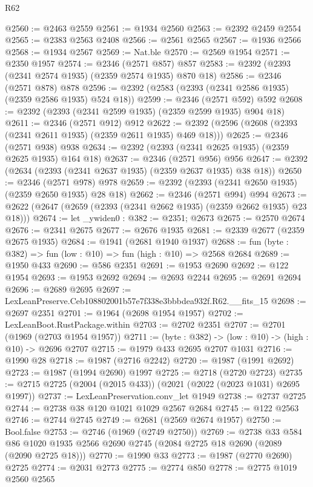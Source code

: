 \begin{lexlean}{R62}
\begin{coremodule}
@2560 := @2463 @2559
@2561 := @1934 @2560
@2563 := @2392 @2459 @2554
@2565 := @2383 @2563 @2408
@2566 := @2561 @2565
@2567 := @1936 @2566
@2568 := @1934 @2567
@2569 := Nat.ble
@2570 := @2569 @1954
@2571 := @2350 @1957
@2574 := @2346 (@2571 @857) @857
@2583 := @2392 (@2393 (@2341 @2574 @1935) (@2359 @2574 @1935) @870 @18)
@2586 := @2346 (@2571 @878) @878
@2596 := @2392 (@2583 (@2393 (@2341 @2586 @1935) (@2359 @2586 @1935) @524 @18))
@2599 := @2346 (@2571 @592) @592
@2608 := @2392 (@2393 (@2341 @2599 @1935) (@2359 @2599 @1935) @904 @18)
@2611 := @2346 (@2571 @912) @912
@2622 := @2392 (@2596 (@2608 (@2393 (@2341 @2611 @1935) (@2359 @2611 @1935) @469 @18)))
@2625 := @2346 (@2571 @938) @938
@2634 := @2392 (@2393 (@2341 @2625 @1935) (@2359 @2625 @1935) @164 @18)
@2637 := @2346 (@2571 @956) @956
@2647 := @2392 (@2634 (@2393 (@2341 @2637 @1935) (@2359 @2637 @1935) @38 @18))
@2650 := @2346 (@2571 @978) @978
@2659 := @2392 (@2393 (@2341 @2650 @1935) (@2359 @2650 @1935) @28 @18)
@2662 := @2346 (@2571 @994) @994
@2673 := @2622 (@2647 (@2659 (@2393 (@2341 @2662 @1935) (@2359 @2662 @1935) @23 @18)))
@2674 := let _ywiden0 : @382 := @2351; @2673
@2675 := @2570 @2674
@2676 := @2341 @2675
@2677 := @2676 @1935
@2681 := @2339 @2677 (@2359 @2675 @1935)
@2684 := @1941 (@2681 @1940 @1937)
@2688 := fun (byte : @382) => fun (low : @10) => fun (high : @10) => @2568 @2684
@2689 := @1950 @433
@2690 := @586 @2351
@2691 := @1953 @2690
@2692 := @122 @1954
@2693 := @1953 @2692
@2694 := @2693 @2244
@2695 := @2691 @2694
@2696 := @2689 @2695
@2697 := LexLeanPreserve.Ceb108802001b57e7f338e3bbbdea932f.R62.__fits_15
@2698 := @2697 @2351
@2701 := @1964 (@2698 @1954 @1957)
@2702 := LexLeanBoot.RustPackage.within
@2703 := @2702 @2351
@2707 := @2701 (@1969 (@2703 @1954 @1957))
@2711 := (byte : @382) -> (low : @10) -> (high : @10) -> @2696 @2707
@2715 := @1979 @433 @2695 @2707 @1031
@2716 := @1990 @28
@2718 := @1987 (@2716 @2242)
@2720 := @1987 (@1991 @2692)
@2723 := @1987 (@1994 @2690) @1997
@2725 := @2718 (@2720 @2723)
@2735 := @2715 @2725 (@2004 (@2015 @433)) (@2021 (@2022 (@2023 @1031) @2695 @1997))
@2737 := LexLeanPreservation.conv_let @1949
@2738 := @2737 @2725
@2744 := @2738 @38 @120 @1021 @1029 @2567 @2684
@2745 := @122 @2563
@2746 := @2744 @2745
@2749 := @2681 (@2569 @2674 @1957)
@2750 := Bool.false
@2753 := @2746 (@1969 (@2749 @2750))
@2769 := @2738
    @33
    @584
    @86
    @1020
    @1935
    @2566
    @2690
    @2745
    (@2084 @2725 @18 @2690 (@2089 (@2090 @2725 @18)))
@2770 := @1990 @33
@2773 := @1987 (@2770 @2690) @2725
@2774 := @2031 @2773
@2775 := @2774 @850
@2778 := @2775 @1019 @2560 @2565

\end{coremodule}
\end{lexlean}
